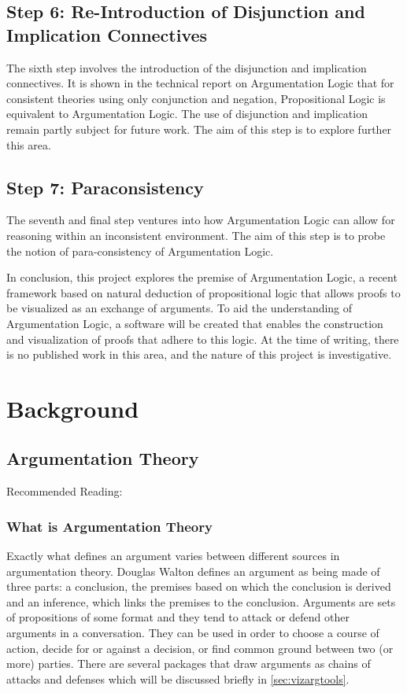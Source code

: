 \documentclass[11pt,twoside,a4paper]{report}
\begin{document}
\section{Step 6: Re-Introduction of Disjunction and Implication Connectives}
The sixth step involves the introduction of the disjunction and implication connectives. It is shown in the technical report on Argumentation Logic that for consistent theories using only conjunction and negation, Propositional Logic is equivalent to Argumentation Logic. The use of disjunction and implication remain partly subject for future work. The aim of this step is to explore further this area.

\section{Step 7: Paraconsistency}
The seventh and final step ventures into how Argumentation Logic can allow for reasoning within an inconsistent environment. The aim of this step is to probe the notion of para-consistency of Argumentation Logic.

In conclusion, this project explores the premise of Argumentation Logic, a recent framework based on natural deduction of propositional logic that allows proofs to be visualized as an exchange of arguments. To aid the understanding of Argumentation Logic, a software will be created that enables the construction and visualization of proofs that adhere to this logic. At the time of writing, there is no published work in this area, and the nature of this project is investigative.

\chapter{Background}

\section{Argumentation Theory}
\label{sec:argtheory}
Recommended Reading: \citep*{argumentationinai}

\subsection{What is Argumentation Theory}
Exactly what defines an argument varies between different sources in argumentation theory. Douglas Walton defines an argument as being made of three parts: a conclusion, the premises based on which the conclusion is derived and an inference, which links the premises to the conclusion. Arguments are sets of propositions of some format and they tend to attack or defend other arguments in a conversation. They can be used in order to choose a course of action, decide for or against a decision, or find common ground between two (or more) parties. There are several packages that draw arguments as chains of attacks and defenses which will be discussed briefly in \autoref{sec:vizargtools}.
\end{document}
